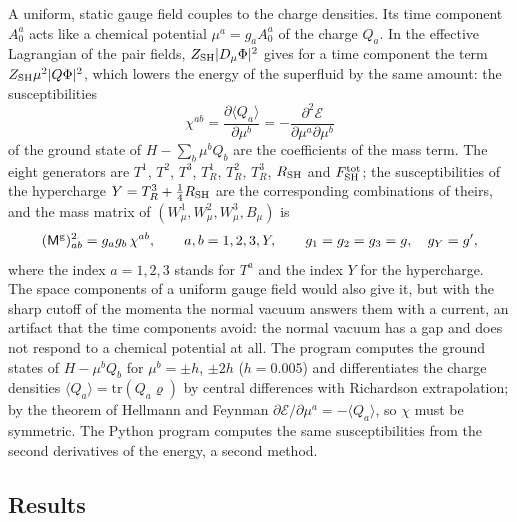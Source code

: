\documentclass[aps,prd,onecolumn,superscriptaddress,nofootinbib,floatfix,longbibliography]{revtex4-2}
\newcommand{\SH}{{\rm SH}}
\newcommand{\tr}{\mathrm{tr}}
\begin{document}
A uniform, static gauge field couples to the charge densities. Its time component $A^a_0$ acts like a chemical potential
$\mu^a=g_aA^a_0$ of the charge $Q_a$. In the effective Lagrangian of the pair fields, $Z_\SH|D_\mu\Phi|^2$ gives for a
time component the term $Z_\SH\mu^2|Q\Phi|^2$, which lowers the energy of the superfluid by the same amount: the
susceptibilities
\begin{equation}
\chi^{ab}=\frac{\partial\langle Q_a\rangle}{\partial\mu^b}=-\frac{\partial^2\mathcal E}{\partial\mu^a\partial\mu^b}
\label{eq:chi}
\end{equation}
of the ground state of $H-\sum_b\mu^bQ_b$ are the coefficients of the mass term. The eight generators are $T^1$, $T^2$,
$T^3$, $T^1_R$, $T^2_R$, $T^3_R$, $R_\SH$ and $F^{\rm tot}_\SH$; the susceptibilities of the hypercharge
$Y=T^3_R+\tfrac14R_\SH$ are the corresponding combinations of theirs, and the mass matrix of $(W^1_\mu,W^2_\mu,W^3_\mu,B_\mu)$ is
\begin{equation}
(\mathsf M^{\rm g})^2_{ab}=g_ag_b\,\chi^{ab},\qquad a,b=1,2,3,Y,\qquad g_1=g_2=g_3=g,\quad g_Y=g',
\label{eq:Mg}
\end{equation}
where the index $a=1,2,3$ stands for $T^a$ and the index $Y$ for the hypercharge.
The space components of a uniform gauge field would also give it, but with the sharp cutoff of the momenta the normal
vacuum answers them with a current, an artifact that the time components avoid: the normal vacuum has a gap and does not
respond to a chemical potential at all. The program computes the ground states of $H-\mu^bQ_b$ for $\mu^b=\pm h$, $\pm2h$
($h=0.005$) and differentiates the charge densities $\langle Q_a\rangle=\tr(Q_a\varrho)$ by central differences with
Richardson extrapolation; by the theorem of Hellmann and Feynman $\partial\mathcal E/\partial\mu^a=-\langle Q_a\rangle$, so
$\chi$ must be symmetric. The Python program computes the same susceptibilities from the second derivatives of the
energy, a second method.

\subsection{Results}
\end{document}
